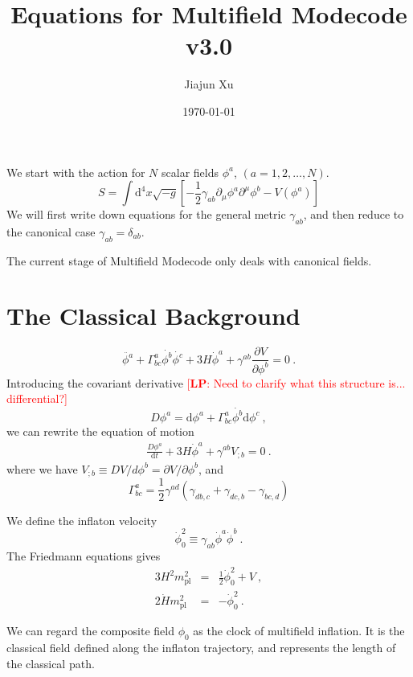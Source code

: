 \documentclass[11pt]{article}
\title{Equations for Multifield Modecode v3.0}
\author{Jiajun Xu}
\date{\today}
\newcommand{\mpl}{m_{\mathrm{pl}}}
\newcommand{\ud}{\mathrm{d}}
\newcommand{\pd}{\partial}
\def\f {{\phi}}
\newcommand{\lp}[1]{\textcolor{red}{[{\bf LP}: #1]}}
\begin{document}
\maketitle

We start with the action for $N$ scalar fields $\phi^a$, $(a=1,2, \dots, N)$. 
\begin{equation}
S = \int \ud^4 x \sqrt{-g} \left[ -\frac{1}{2} \gamma_{ab} \pd_\mu \phi^a \pd^\mu \phi^b - V(\f^a) \right]
\end{equation}
We will first write down equations for the general metric $\gamma_{ab}$, and then reduce to the canonical case $\gamma_{ab} =\delta_{ab}$. 

The current stage of Multifield Modecode only deals with canonical fields. 

\section{The Classical Background}

\begin{equation}\label{bg_phi}
\ddot{\f^a} + \Gamma^a_{bc} \dot{\f^b} \dot{\f^c} + 3H \dot\f^a + \gamma^{ab} \frac{\pd V}{\pd \f^b} = 0  ~.
\end{equation}
Introducing the covariant derivative \lp{Need to clarify what this structure is... differential?}
\begin{equation}
D \f^a = \ud \f^a + \Gamma^a_{bc}\dot{\f^b}\ud\f^c ~,
\end{equation}
we can rewrite the equation of motion
\begin{eqnarray}
\frac{D\f^a}{\ud t} + 3H \dot\f^a + \gamma^{ab} V_{; b} = 0 ~. 
\end{eqnarray}
where we have $V_{;b} \equiv D V / d \f^b = \pd V/\pd \phi^b$, and
\[
\Gamma^a_{bc} = \frac{1}{2} \gamma^{ad}\left( \gamma_{db, c} + \gamma_{dc,b} - \gamma_{bc, d} \right)
\]

We define the inflaton velocity
\[
{\dot\f}_0^2 \equiv \gamma_{ab} {\dot\f}^a {\dot\f}^b ~. 
\]
The Friedmann equations gives
\begin{eqnarray}\label{fr_1}
3H^2\mpl^2 &=& \frac{1}{2} {\dot\f}_0^2 + V ~, \\ 
2\dot{H} \mpl^2 &=& - {\dot\f}_0^2 ~. \label{fr_2}
\end{eqnarray}

We can regard the composite field $\phi_0$ as the clock of multifield inflation. It is the classical field defined along the 
inflaton trajectory, and represents the length of the classical path. 
\end{document}
